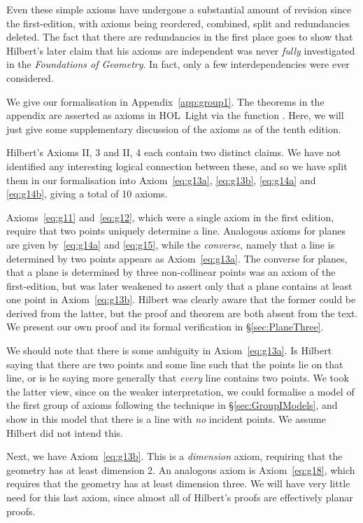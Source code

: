Even these simple axioms have undergone a substantial amount of revision since the first-edition, with axioms being reordered, combined, split and redundancies deleted. The fact that there are redundancies in the first place goes to show that Hilbert's later claim that his axioms are independent was never \emph{fully} investigated in the \emph{Foundations of Geometry}. In fact, only a few interdependencies were ever considered.

We give our formalisation in Appendix~\ref{app:group1}. The theorems in the appendix are asserted as axioms in HOL~Light via the function . Here, we will just give some supplementary discussion of the axioms as of the tenth edition.

Hilbert's Axioms II, 3 and II, 4 each contain two distinct claims. We have not identified any interesting logical connection between these, and so we have split them in our formalisation into Axiom~\ref{eq:g13a}, \ref{eq:g13b}, \ref{eq:g14a} and \ref{eq:g14b}, giving a total of 10 axioms. 

Axioms~\ref{eq:g11} and~\ref{eq:g12}, which were a single axiom in the first edition, require that two points uniquely determine a line. Analogous axioms for planes are given by~\ref{eq:g14a} and \ref{eq:g15}, while the \emph{converse}, namely that a line is determined by two points appears as Axiom~\ref{eq:g13a}. The converse for planes, that a plane is determined by three non-collinear points was an axiom of the first-edition, but was later weakened to assert only that a plane contains at least one point in Axiom~\ref{eq:g13b}. Hilbert was clearly aware that the former could be derived from the latter, but the proof and theorem are both absent from the text. We present our own proof and its formal verification in \S\ref{sec:PlaneThree}.

\label{sec:DanglingPoints}
We should note that there is some ambiguity in Axiom~\ref{eq:g13a}. Is Hilbert saying that there are two points and some line such that the points lie on that line, or is he saying more generally that \emph{every} line contains two points. We took the latter view, since on the weaker interpretation, we could formalise a model of the first group of axioms following the technique in \S\ref{sec:GroupIModels}, and show in this model that there is a line with \emph{no} incident points. We assume Hilbert did not intend this. 

Next, we have Axiom~\ref{eq:g13b}. This is a \emph{dimension} axiom, requiring that the geometry has at least dimension 2. An analogous axiom is Axiom~\ref{eq:g18}, which requires that the geometry has at least dimension three. We will have very little need for this last axiom, since almost all of Hilbert's proofs are effectively planar proofs.

